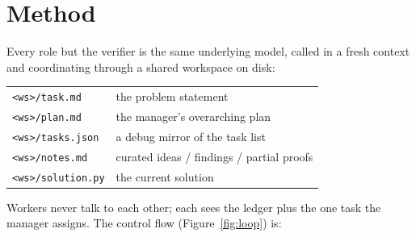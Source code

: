 \documentclass{article}
\begin{document}
\section{Method}
\label{sec:method}

Every role but the verifier is the same underlying model, called in a fresh context and
coordinating through a shared workspace on disk:

\begin{center}
\small
\begin{tabular}{@{}ll@{}}
\texttt{<ws>/task.md}     & the problem statement \\
\texttt{<ws>/plan.md}     & the manager's overarching plan \\
\texttt{<ws>/tasks.json}  & a debug mirror of the task list \\
\texttt{<ws>/notes.md}    & curated ideas / findings / partial proofs \\
\texttt{<ws>/solution.py} & the current solution \\
\end{tabular}
\end{center}

Workers never talk to each other; each sees the ledger plus the one task the manager
assigns. The control flow (Figure~\ref{fig:loop}) is:
\end{document}
